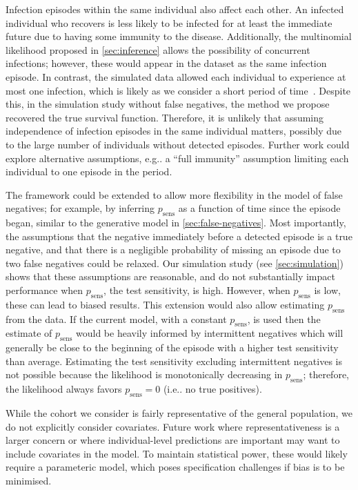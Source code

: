 \documentclass[referee,useAMS,usenatbib]{biom}
\makeatletter
\newcommand{\psens}{p_\text{sens}}
\DeclareRobustCommand\onedot{\futurelet\@let@token\@onedot}
\def\@onedot{\ifx\@let@token.\else.\null\fi\xspace}
\def\eg{e.g\onedot} \def\Eg{{E.g}\onedot}
\def\ie{i.e\onedot} \def\Ie{{I.e}\onedot}
\makeatother
\begin{document}
Infection episodes within the same individual also affect each other.
An infected individual who recovers is less likely to be infected for at least the immediate future due to having some immunity to the disease.
Additionally, the multinomial likelihood proposed in \cref{sec:inference} allows the possibility of concurrent infections; however, these would appear in the dataset as the same infection episode.
In contrast, the simulated data allowed each individual to experience at most one infection, which is likely as we consider a short period of time~\citep{milneImmunity}.
Despite this, in the simulation study without false negatives, the method we propose recovered the true survival function.
Therefore, it is unlikely that assuming independence of infection episodes in the same individual matters, possibly due to the large number of individuals without detected episodes.
Further work could explore alternative assumptions, \eg a ``full immunity'' assumption limiting each individual to one episode in the period.

The framework could be extended to allow more flexibility in the model of false negatives; for example, by inferring $\psens$ as a function of time since the episode began, similar to the generative model in \cref{sec:false-negatives}.
Most importantly, the assumptions that the negative immediately before a detected episode is a true negative, and that there is a negligible probability of missing an episode due to two false negatives could be relaxed.
Our simulation study (see \cref{sec:simulation}) shows that these assumptions are reasonable, and do not substantially impact performance when $\psens$, the test sensitivity, is high.
However, when $\psens$ is low, these can lead to biased results.
This extension would also allow estimating $\psens$ from the data.
If the current model, with a constant $\psens$, is used then the estimate of $\psens$ would be heavily informed by intermittent negatives which will generally be close to the beginning of the episode with a higher test sensitivity than average.
Estimating the test sensitivity excluding intermittent negatives is not possible because the likelihood is monotonically decreasing in $\psens$; therefore, the likelihood always favors $\psens = 0$ (\ie no true positives).

While the cohort we consider is fairly representative of the general population, we do not explicitly consider covariates.
Future work where representativeness is a larger concern or where individual-level predictions are important may want to include covariates in the model.
To maintain statistical power, these would likely require a parameteric model, which poses specification challenges if bias is to be minimised.
\end{document}

